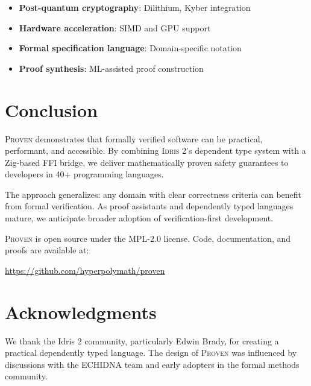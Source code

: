 \documentclass[11pt,a4paper]{article}
\newcommand{\proven}{\textsc{Proven}}
\newcommand{\idris}{\textsc{Idris 2}}
\begin{document}
\begin{itemize}
    \item \textbf{Post-quantum cryptography}: Dilithium, Kyber integration
    \item \textbf{Hardware acceleration}: SIMD and GPU support
    \item \textbf{Formal specification language}: Domain-specific notation
    \item \textbf{Proof synthesis}: ML-assisted proof construction
\end{itemize}

\section{Conclusion}

\proven{} demonstrates that formally verified software can be practical, performant, and accessible. By combining \idris{}'s dependent type system with a Zig-based FFI bridge, we deliver mathematically proven safety guarantees to developers in 40+ programming languages.

The approach generalizes: any domain with clear correctness criteria can benefit from formal verification. As proof assistants and dependently typed languages mature, we anticipate broader adoption of verification-first development.

\proven{} is open source under the MPL-2.0 license. Code, documentation, and proofs are available at:

\begin{center}
\url{https://github.com/hyperpolymath/proven}
\end{center}

\section*{Acknowledgments}

We thank the Idris 2 community, particularly Edwin Brady, for creating a practical dependently typed language. The design of \proven{} was influenced by discussions with the ECHIDNA team and early adopters in the formal methods community.
\end{document}
